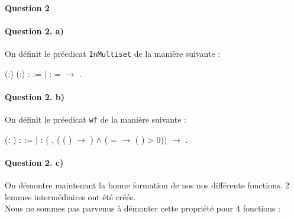 \documentclass{report}
\begin{document}
\paragraph{Question 2}

\paragraph{Question 2. a)}

On définit le préedicat \texttt{InMultiset} de la manière suivante :

\noindent\begin{coqdoccode}
\coqdocemptyline
\coqdocnoindent
{}  (:) (:) :  := \coqdoceol
\coqdocindent{1.00em}
\ensuremath{|}  :    =  \ensuremath{\rightarrow}   .\coqdoceol
\coqdocemptyline
\coqdocemptyline
\end{coqdoccode}

\paragraph{Question 2. b)}

On définit le préedicat \texttt{wf} de la manière suivante :

\noindent\begin{coqdoccode}
\coqdocemptyline
\coqdocnoindent
{}  (: ) :  :=\coqdoceol
\coqdocindent{1.00em}
\ensuremath{|}  : (\coqdockw{\ensuremath{\forall}} , (  (  ) \ensuremath{\rightarrow} ) \ensuremath{\land} (   =  \ensuremath{\rightarrow} (  ) > 0)) \ensuremath{\rightarrow}  .\coqdoceol
\coqdocemptyline
\end{coqdoccode}

\paragraph{Question 2. c)}

On démontre maintenant la bonne formation de nos nos différente fonctions. 2 lemmes intermédiaires ont été créés.\\
Nous ne sommes pas parvenus à démonter cette propriété pour 4 fonctions :
\end{document}
